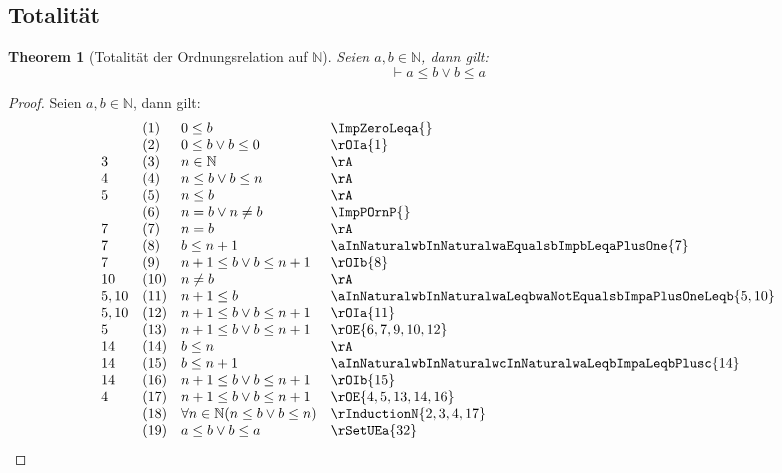 \documentclass{book}
\theoremstyle{plain}
\newtheorem{theorem}{Theorem}
\theoremstyle{remark}
\theoremstyle{definition}
\begin{document}
\subsection{Totalität}

\label{ImpaLeqbOrbLeqa}
\begin{theorem}[Totalität der Ordnungsrelation auf \(\mathbb{N}\)]
Seien \(a,b\in\mathbb{N}\), dann gilt:
\[\vdash a\leq b\lor b\leq a\]
\end{theorem}
\begin{proof}
    Seien \(a,b\in\mathbb{N}\), dann gilt:
        \[
	\begin{array}{llll}
                    &  (1) & 0\leq b & \ImpZeroLeqa{} \\
                    &  (2) & 0\leq b\lor b\leq 0 & \rOIa{1} \\
        3           &  (3) & n\in\mathbb{N} & \rA \\           
        4           &  (4) & n\leq b\lor b\leq n & \rA \\    
        5           &  (5) & n\leq b & \rA \\  
                    &  (6) & n=b\lor n\neq b & \ImpPOrnP{} \\  
        7           &  (7) & n=b & \rA \\  
        7           &  (8) & b\leq n+1 & \aInNaturalwbInNaturalwaEqualsbImpbLeqaPlusOne{7} \\  
        7           &  (9) & n+1\leq b\lor b\leq n+1 & \rOIb{8} \\ 
        10          &  (10) & n\neq b & \rA \\ 
        5,10        &  (11) & n+1\leq b & \aInNaturalwbInNaturalwaLeqbwaNotEqualsbImpaPlusOneLeqb{5,10} \\ 
        5,10        &  (12) & n+1\leq b\lor b\leq n+1 & \rOIa{11} \\ 
        5           &  (13) & n+1\leq b\lor b\leq n+1 & \rOE{6,7,9,10,12} \\ 
        14          &  (14) & b\leq n & \rA \\  
        14          &  (15) & b\leq n+1 & \aInNaturalwbInNaturalwcInNaturalwaLeqbImpaLeqbPlusc{14} \\  
        14          &  (16) & n+1\leq b\lor b\leq n+1 & \rOIb{15} \\ 
         4          &  (17) & n+1\leq b\lor b\leq n+1 & \rOE{4,5,13,14,16} \\ 
                    &  (18) & \forall n\in\mathbb{N}(n\leq b\lor b\leq n) & \rInductionN{2,3,4,17} \\ 
                    &  (19) & a\leq b\lor b\leq a & \rSetUEa{32} \\ 
    \end{array}
	\]
\end{proof}
\end{document}
